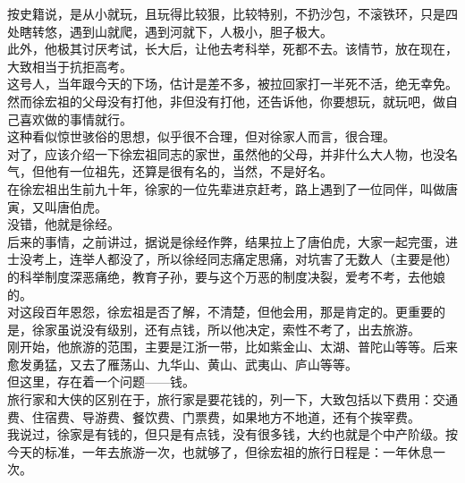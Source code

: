\begin{multicols}{\theparacolNo}
按史籍说，是从小就玩，且玩得比较狠，比较特别，不扔沙包，不滚铁环，只是四处瞎转悠，遇到山就爬，遇到河就下，人极小，胆子极大。\\

此外，他极其讨厌考试，长大后，让他去考科举，死都不去。该情节，放在现在，大致相当于抗拒高考。\\

这号人，当年跟今天的下场，估计是差不多，被拉回家打一半死不活，绝无幸免。\\

然而徐宏祖的父母没有打他，非但没有打他，还告诉他，你要想玩，就玩吧，做自己喜欢做的事情就行。\\

这种看似惊世骇俗的思想，似乎很不合理，但对徐家人而言，很合理。\\

对了，应该介绍一下徐宏祖同志的家世，虽然他的父母，并非什么大人物，也没名气，但他有一位祖先，还算是很有名的，当然，不是好名。\\

在徐宏祖出生前九十年，徐家的一位先辈进京赶考，路上遇到了一位同伴，叫做唐寅，又叫唐伯虎。\\

没错，他就是徐经。\\

后来的事情，之前讲过，据说是徐经作弊，结果拉上了唐伯虎，大家一起完蛋，进士没考上，连举人都没了，所以徐经同志痛定思痛，对坑害了无数人（主要是他）的科举制度深恶痛绝，教育子孙，要与这个万恶的制度决裂，爱考不考，去他娘的。\\

对这段百年恩怨，徐宏祖是否了解，不清楚，但他会用，那是肯定的。更重要的是，徐家虽说没有级别，还有点钱，所以他决定，索性不考了，出去旅游。\\

刚开始，他旅游的范围，主要是江浙一带，比如紫金山、太湖、普陀山等等。后来愈发勇猛，又去了雁荡山、九华山、黄山、武夷山、庐山等等。\\

但这里，存在着一个问题——钱。\\

旅行家和大侠的区别在于，旅行家是要花钱的，列一下，大致包括以下费用：交通费、住宿费、导游费、餐饮费、门票费，如果地方不地道，还有个挨宰费。\\

我说过，徐家是有钱的，但只是有点钱，没有很多钱，大约也就是个中产阶级。按今天的标准，一年去旅游一次，也就够了，但徐宏祖的旅行日程是：一年休息一次。\\


\end{multicols}
